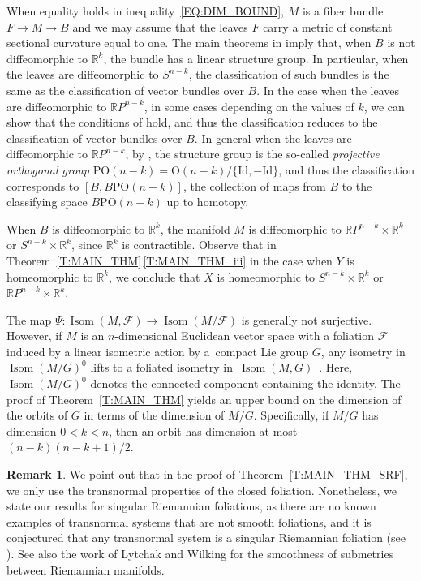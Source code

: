 \documentclass[10pt,a4paper]{amsart}
\numberwithin{equation}{section}
\theoremstyle{definition}
\newtheorem{rem}[thm]{Remark}
\DeclareMathOperator{\Iso}{Isom}
\newcommand{\R}{\mathbb{R}} %
\newcommand{\RP}{\mathbb{R}P} %
\newcommand{\fol}{\mathcal{F}}
\begin{document}
	
When equality holds in inequality~\eqref{EQ:DIM_BOUND}, $M$ is a fiber bundle $F\to M\to B$ and we may assume that the leaves $F$ carry a metric of constant sectional curvature equal to one. The main theorems in \cite{CorroGuentherGarciaKordass2020,FarrellGangKnopfOntaneda2017} imply that, when $B$ is not diffeomorphic to $\R^k$, the bundle has a linear structure group. In particular, when the leaves are diffeomorphic to $S^{n-k}$, the classification of such bundles is the same as the classification of vector bundles over $B$. In the case when the leaves are diffeomorphic to $\RP^{n-k}$, in some cases depending on the values of $k$, we can show that the conditions of \cite[Theorem 1]{BeckerGottlieb1973} hold, and thus the classification reduces to the classification of vector bundles over $B$. In general when the leaves are diffeomorphic to $\RP^{n-k}$, by \cite{CorroGuentherGarciaKordass2020}, the structure group is the so-called \emph{projective orthogonal group} $\mathrm{PO}(n-k)=\mathrm{O}(n-k)/\{\mathrm{Id},-\mathrm{Id}\}$, and thus the classification corresponds to $[B,B\mathrm{PO}(n-k)]$, the collection of maps from $B$ to the classifying space $B\mathrm{PO}(n-k)$ up to homotopy.

When $B$ is diffeomorphic to $\R^k$, the manifold $M$ is diffeomorphic to $\R P^{n-k}\times \R^k$ or $S^{n-k}\times \R^k$, since $\R^k$ is contractible. Observe that in Theorem~\ref{T:MAIN_THM}\,\ref{T:MAIN_THM_iii} in the case when $Y$ is homeomorphic to $\R^k$, we conclude that $X$ is homeomorphic to $S^{n-k}\times\R^k$ or $\RP^{n-k}\times\R^k$.

The map $\Psi\colon\Iso(M,\fol)\to \Iso(M/\fol)$ is generally not surjective. However, if $M$ is an $n$-dimensional Euclidean vector space with a foliation $\fol$ induced by a linear isometric action by a~compact Lie group $G$, any isometry in $\Iso(M/G)^0$ lifts to a foliated isometry in~$\Iso(M,G)$~\cite{Mendes2020}. Here, $\Iso(M/G)^0$ denotes the connected component containing the identity. The proof of Theorem~\ref{T:MAIN_THM} yields an upper bound on the dimension of the orbits of $G$ in terms of the dimension of $M/G$. Specifically, if $M/G$ has dimension $0<k<n$, then an orbit has dimension at most~${(n-k)(n-k+1)/2}$.

\begin{rem}
We point out that in the proof of Theorem~\ref{T:MAIN_THM_SRF}, we only use the transnormal properties of the closed foliation. Nonetheless, we state our results for singular Riemannian foliations, as there are no known examples of transnormal systems that are not smooth foliations, and it is conjectured that any transnormal system is a singular Riemannian foliation (see \cite[Final remarks]{Wilking2007}).
See also the work of Lytchak and Wilking \cite{LytchakWilking2024} for the smoothness of submetries between Riemannian manifolds.
\end{rem}
\end{document}
